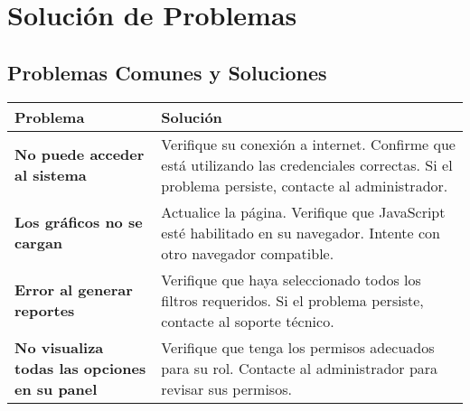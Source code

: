 \documentclass[12pt,a4paper]{article}
\begin{document}
\section{Solución de Problemas}\label{sec:solucion-problemas}
\subsection{Problemas Comunes y Soluciones}
\begin{tabularx}{\textwidth}{>{\bfseries}lX}
\toprule
Problema & Solución \\
\midrule
No puede acceder al sistema & Verifique su conexión a internet. Confirme que está utilizando las credenciales correctas. Si el problema persiste, contacte al administrador. \\
Los gráficos no se cargan & Actualice la página. Verifique que JavaScript esté habilitado en su navegador. Intente con otro navegador compatible. \\
Error al generar reportes & Verifique que haya seleccionado todos los filtros requeridos. Si el problema persiste, contacte al soporte técnico. \\
No visualiza todas las opciones en su panel & Verifique que tenga los permisos adecuados para su rol. Contacte al administrador para revisar sus permisos. \\
\bottomrule
\end{tabularx}
\end{document}
